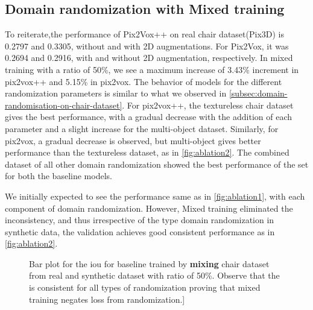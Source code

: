 \subsection{Domain randomization with Mixed training}\label{subsec:domain-randomisation-with-mixed-training}

To reiterate,the performance of Pix2Vox++ on real chair dataset(Pix3D) is 0.2797 and 0.3305, without and with 2D augmentations.
For Pix2Vox, it was 0.2694 and 0.2916, with and without 2D augmentation, respectively.
In mixed training with a ratio of 50\%, we see a maximum increase of 3.43\% increment in pix2vox++ and 5.15\% in pix2vox.
The behavior of models for the different randomization parameters is similar to what we observed in \autoref{subsec:domain-randomisation-on-chair-dataset}.
For pix2vox++, the textureless chair dataset gives the best performance, with a gradual decrease with the addition of each parameter and a slight increase for the multi-object dataset.
Similarly, for pix2vox, a gradual decrease is observed, but multi-object gives better performance than the textureless dataset, as in \autoref{fig:ablation2}.
The combined dataset of all other domain randomization showed the best performance of the set for both the baseline models.

We initially expected to see the performance same as in \autoref{fig:ablation1}, with each component of domain randomization.
However, Mixed training eliminated the inconsistency, and thus irrespective of the type domain randomization in synthetic data, the validation achieves good consistent performance as in \autoref{fig:ablation2}.

\begin{figure}[ht]
    \centering
    \resizebox{0.75\textwidth}{!}{}
    \caption{Bar plot for the \gls{iou}  for baseline trained by \textbf{mixing} chair dataset from real and synthetic dataset with ratio of 50\%.
    Observe that the  is consistent for all types of randomization proving that mixed training negates loss from randomization.]}
    \label{fig:ablation2}
\end{figure}


